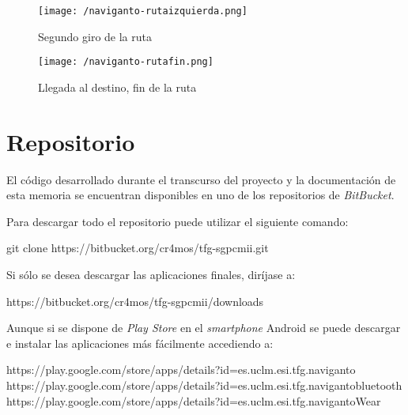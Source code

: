 \begin{figure}[!h]
  \begin{minipage}[b]{0.5\linewidth}
    \begin{center}
      \texttt{[image: /naviganto-rutaizquierda.png]}
      \caption{Segundo giro de la ruta}
      \label{fig:navigantoRutaSegundoGiro}
    \end{center}
  \end{minipage}
  \begin{minipage}[b]{0.5\linewidth}
    \begin{center}
      \texttt{[image: /naviganto-rutafin.png]}
      \caption{Llegada al destino, fin de la ruta}
      \label{fig:navigantoRutaFin}
    \end{center}
  \end{minipage}
\end{figure}

\newpage %
\section{Repositorio}

El código desarrollado durante el transcurso del proyecto y la documentación de esta memoria se
encuentran disponibles en uno de los repositorios de \emph{BitBucket}.

Para descargar todo el repositorio puede utilizar el siguiente comando:

\begin{listing}[
  float=ht,
  language = Bash]
git clone https://bitbucket.org/cr4mos/tfg-sgpcmii.git
\end{listing}

Si sólo se desea descargar las aplicaciones finales, diríjase a:

\begin{listing}
https://bitbucket.org/cr4mos/tfg-sgpcmii/downloads
\end{listing}

Aunque si se dispone de \emph{Play Store} en el \emph{smartphone} Android se puede descargar e
instalar las aplicaciones más fácilmente accediendo a:

\begin{listing}[basicstyle = \scriptsize\lstfont]
https://play.google.com/store/apps/details?id=es.uclm.esi.tfg.naviganto
https://play.google.com/store/apps/details?id=es.uclm.esi.tfg.navigantobluetooth
https://play.google.com/store/apps/details?id=es.uclm.esi.tfg.navigantoWear
\end{listing}

